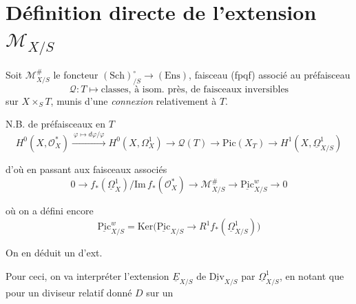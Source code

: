 \documentclass[11pt,a4paper]{article}
\begin{document}
\section{Définition directe de l'extension $\mathcal{M}_{X/S}$}

Soit $\mathcal{M}^{\#}_{X/S}$ le foncteur $(\mathrm{Sch})_{/S}^{\circ} \to (\mathrm{Ens})$, faisceau (fpqf) associé au préfaisceau
\[
  \mathcal{Q} : T \longmapsto \text{classes, à isom.\ près, de faisceaux inversibles}
\]
sur $X \times_S T$, munis d'une \emph{connexion} relativement à $T$.

\struck{\ill{}} N.B.  de préfaisceaux en $T$
\[
  H^0(X, \mathcal{O}_X^*) \xrightarrow{\ \varphi \mapsto d\varphi/\varphi\ } H^0(X, \Omega^1_X) \to \mathcal{Q}(T) \to \mathrm{Pic}(X_T) \to H^1(X, \underline{\Omega}^1_{X/S})
\]

d'où en passant aux faisceaux associés
\[
  0 \to f_*(\underline{\Omega}^1_X)/\mathrm{Im}\, f_*(\mathcal{O}_X^*) \to \mathcal{M}^{\#}_{X/S} \to \underline{\mathrm{Pic}}^{w}_{X/S} \to 0
\]

où on a défini encore
\[
  \underline{\mathrm{Pic}}^{w}_{X/S} = \mathrm{Ker}\bigl(\underline{\mathrm{Pic}}_{X/S} \to R^1f_*(\underline{\Omega}^1_{X/S})\bigr)
\]

On en déduit un   d'ext.



Pour ceci, on va interpréter  l'extension $\underline{E}_{X/S}$ de $\underline{\mathrm{Div}}_{X/S}$ par $\underline{\Omega}^1_{X/S}$, en notant que pour un diviseur relatif donné $D$ sur un
\end{document}
